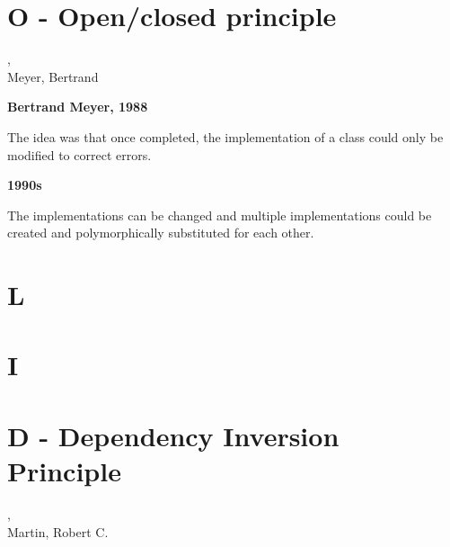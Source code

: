 

\section{O - Open/closed principle} %
\label{sec:o}

\begin{frame}
	, \\Meyer, Bertrand
\end{frame}

\begin{frame}


\begin{Parallel}[v]{5cm}{5cm}
    \ParallelLText%
    {
    	\textbf{Bertrand Meyer, 1988}

    	The idea was that once completed, the implementation of a class could only be modified to correct errors.
    }
    \ParallelRText%
    {
    	\textbf{1990s}

    	The implementations can be changed and multiple implementations could be created and polymorphically substituted for each other.
	}
\end{Parallel}

\end{frame}


\section{L} %
\label{sec:l}


\section{I} %
\label{sec:i}


\section{D - Dependency Inversion Principle} %
\label{sec:d}

\begin{frame}
    , \\Martin, Robert C.
\end{frame}


